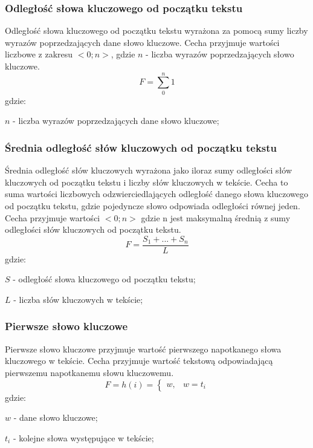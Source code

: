 \documentclass{classrep}
\begin{document}
\subsubsection{Odległość słowa kluczowego od początku tekstu}
Odległość słowa kluczowego od początku tekstu wyrażona za pomocą sumy liczby wyrazów poprzedzających
dane słowo kluczowe.
Cecha przyjmuje wartości liczbowe z zakresu $<0; n>$, gdzie $n$ - liczba wyrazów poprzedzających słowo kluczowe.
\begin{equation}
    F=\sum_{0}^{n}1
\end{equation}
gdzie:\\
\begin{description}
    \item $n$ - liczba wyrazów poprzedzających dane słowo kluczowe;
\end{description}


\subsubsection{Średnia odległość słów kluczowych od początku tekstu}
Średnia odległość słów kluczowych wyrażona jako iloraz sumy odległości słów kluczowych od początku tekstu i liczby
słów kluczowych w tekście. Cecha to suma wartości liczbowych odzwierciedlających odległość danego słowa kluczowego
od początku tekstu, gdzie pojedyncze słowo odpowiada odległości równej jeden. Cecha przyjmuje wartości $<0; n>$ gdzie n
jest maksymalną średnią z sumy odległości słów kluczowych od początku tekstu.
\begin{equation}
    F=\frac{S_{1} + ... + S_{n}}{L}
\end{equation}
gdzie:\\
\begin{description}
    \item $S$ - odległość słowa kluczowego od początku tekstu;
    \item $L$ -  liczba słów kluczowych w tekście;
\end{description}

\subsubsection{Pierwsze słowo kluczowe}
Pierwsze słowo kluczowe przyjmuje wartość pierwszego napotkanego słowa kluczowego w tekście. Cecha przyjmuje wartość
tekstową odpowiadającą pierwszemu napotkanemu słowu kluczowemu.
\begin{equation}
    F= h(i)=\left\{\begin{matrix}
       w, & w = t_{i}
    \end{matrix}\right.
\end{equation}
gdzie:\\
\begin{description}
    \item $w$ - dane słowo kluczowe;
    \item $t_{i}$ - kolejne słowa występujące w tekście;
\end{description}
\end{document}

